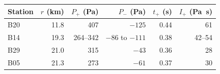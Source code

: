 \begin{tabular}{lrrrrr}
\toprule
Station & $r$ (km) & $P_+$ (Pa) & $P_-$ (Pa) & $t_+$ (s) & $I_+$ (Pa~s) \\
\midrule
B20 & 11.8 & 407 & $-125$ & 0.44 & 61 \\
B14 & 19.3 & 264--342 & $-86$ to $-111$ & 0.38 & 42--54 \\
B29 & 21.0 & 315 & $-43$ & 0.36 & 28 \\
B05 & 21.3 & 273 & $-61$ & 0.37 & 30 \\
\bottomrule
\end{tabular}
